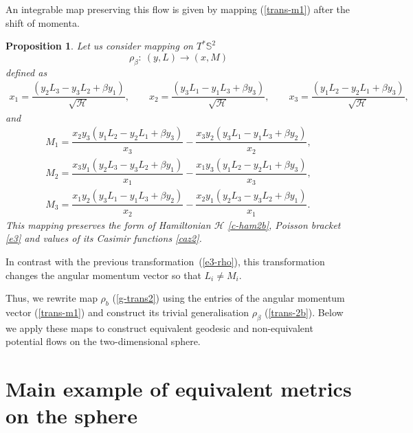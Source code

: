\documentclass[pdftex]{sigma}
\numberwithin{equation}{section}
\newtheorem{Proposition}[Theorem]{Proposition}
 { \theoremstyle{definition}
\newtheorem{Definition}[Theorem]{Definition}
\newtheorem{Note}[Theorem]{Note}
\newtheorem{Example}[Theorem]{Example}
\newtheorem{Remark}[Theorem]{Remark} }
\begin{document}
An integrable map preserving this flow is given by mapping (\ref{trans-m1}) after the shift of momenta.
\begin{Proposition}
Let us consider mapping on $T^*\mathbb S^2$
\[\rho_\beta\colon \  (y,L)\to (x,M)\]
 defined as
\begin{gather*}
x_1=\dfrac{(y_2L_3-y_3L_2+\beta y_1)}{\sqrt{\mathcal H}} ,\qquad\!\!
x_2=\dfrac{(y_3L_1-y_1L_3+\beta y_3)}{\sqrt{\mathcal H}} ,\qquad\!\!
x_3=\dfrac{(y_1L_2-y_2L_1+\beta y_3)}{\sqrt{\mathcal H}} ,
\end{gather*}
and
\begin{gather}
M_1=\dfrac{x_2y_3(y_1L_2 -y_2 L_1+\beta y_3)}{x_3} -\dfrac{ x_3y_2(y_3L_1 -y_1 L_3+\beta y_2)}{x_2} ,\nonumber\\
M_2=\dfrac{ x_3y_1(y_2L_3 - y_3L_2+\beta y_1)}{x_1}-\dfrac{x_1y_3(y_1L_2-y_2L_1+\beta y_3)}{x_3} ,\nonumber\\
M_3=\dfrac{x_1y_2(y_3L_1 -y_1L_3+\beta y_2)}{x_2}-\dfrac{x_2y_1(y_2L_3 -y_3L_2+\beta y_1)}{x_1} .\label{trans-2b}
\end{gather}
This mapping preserves the form of Hamiltonian $\mathcal H$ \eqref{c-ham2b}, Poisson bracket \eqref{e3} and values of its Casimir functions \eqref{caz2}.
\end{Proposition}
In contrast with the previous transformation~(\ref{e3-rho}), this transformation changes the angular momentum vector so that $L_i\neq M_i$.

Thus, we rewrite map $\rho_b$ (\ref{g-trans2}) using the entries of the angular momentum vector (\ref{trans-m1}) and construct its trivial generalisation $\rho_\beta$ (\ref{trans-2b}). Below we apply these maps to construct equivalent geodesic and non-equivalent potential flows on the two-dimensional sphere.

\section{Main example of equivalent metrics on the sphere}\label{section3}
\end{document}
